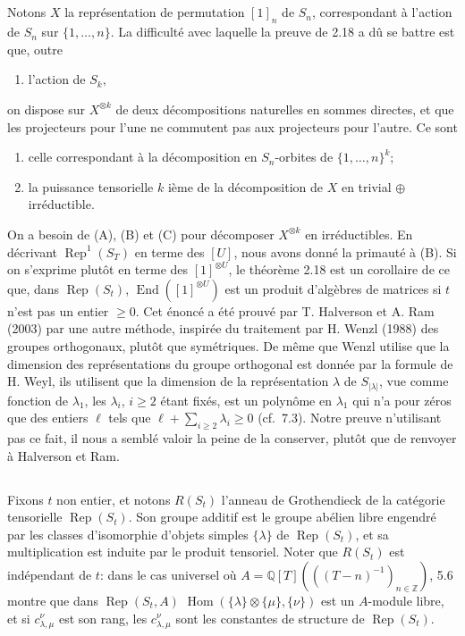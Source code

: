 \documentclass[11pt,a4paper]{article}
\theoremstyle{plain}
\theoremstyle{definition}
\DeclareMathOperator{\Hom}{Hom}
\DeclareMathOperator{\End}{End}
\DeclareMathOperator{\Rep}{Rep}
\newcommand{\Z}{\mathbb{Z}}
\newcommand{\Q}{\mathbb{Q}}
\begin{document}
\subsection{}
Notons $X$ la repr\'esentation de permutation $[1]_n$ de $S_n$, correspondant \`a l'action de $S_n$ sur $\{1, \ldots, n\}$. La difficult\'e avec laquelle la preuve de 2.18 a d\^u se battre est que, outre
\begin{enumerate}[label=(\Alph*)]
\item l'action de $S_k$,
\end{enumerate}
on dispose sur $X^{\otimes k}$ de deux d\'ecompositions naturelles en sommes directes, et que les projecteurs pour l'une ne commutent pas aux projecteurs pour l'autre. Ce sont
\begin{enumerate}[label=(\Alph*),start=2]
\item celle correspondant \`a la d\'ecomposition en $S_n$-orbites de $\{1, \ldots, n\}^k$;
\item la puissance tensorielle $k$ i\`eme de la d\'ecomposition de $X$ en trivial $\oplus$ irr\'eductible.
\end{enumerate}

On a besoin de (A), (B) et (C) pour d\'ecomposer $X^{\otimes k}$ en irr\'eductibles. En d\'ecrivant $\Rep^1(S_T)$ en terme des $[U]$, nous avons donn\'e la primaut\'e \`a (B). Si on s'exprime plut\^ot en terme des $[1]^{\otimes U}$, le th\'eor\`eme 2.18 est un corollaire de ce que, dans $\Rep(S_t)$, $\End([1]^{\otimes U})$ est un produit d'alg\`ebres de matrices si $t$ n'est pas un entier $\geq 0$. Cet \'enonc\'e a \'et\'e prouv\'e par T. Halverson et A. Ram (2003) par une autre m\'ethode, inspir\'ee du traitement par H. Wenzl (1988) des groupes orthogonaux, plut\^ot que sym\'etriques. De m\^eme que Wenzl utilise que la dimension des repr\'esentations du groupe orthogonal est donn\'ee par la formule de H. Weyl, ils utilisent que la dimension de la repr\'esentation $\lambda$ de $S_{|\lambda|}$, vue comme fonction de $\lambda_1$, les $\lambda_i$, $i \geq 2$ \'etant fix\'es,
est un polyn\^ome en $\lambda_1$ qui n'a pour z\'eros que des entiers $\ell$ tels que $\ell + \sum_{i \geq 2} \lambda_i \geq 0$ (cf.~7.3). Notre preuve n'utilisant pas ce fait, il nous a sembl\'e valoir la peine de la conserver, plut\^ot que de renvoyer \`a Halverson et Ram.

\subsection{}
Fixons $t$ non entier, et notons $R(S_t)$ l'anneau de Grothendieck de la cat\'egorie tensorielle $\Rep(S_t)$. Son groupe additif est le groupe ab\'elien libre engendr\'e par les classes d'isomorphie d'objets simples $\{\lambda\}$ de $\Rep(S_t)$, et sa multiplication est induite par le produit tensoriel. Noter que $R(S_t)$ est ind\'ependant de $t$: dans le cas universel o\`u $A = \Q[T](((T-n)^{-1})_{n \in \Z})$, 5.6 montre que dans $\Rep(S_t, A)$ $\Hom(\{\lambda\} \otimes \{\mu\}, \{\nu\})$ est un $A$-module libre, et si $c^{\nu}_{\lambda,\mu}$ est son rang, les $c^{\nu}_{\lambda,\mu}$ sont les constantes de structure de $\Rep(S_t)$.
\end{document}
